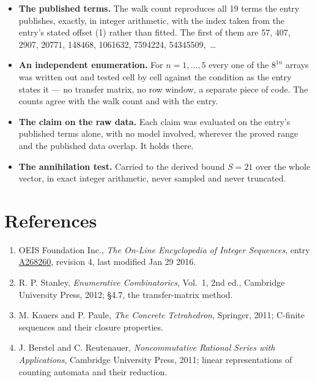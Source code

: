 \documentclass[11pt]{article}
\theoremstyle{definition}
\begin{document}
\begin{itemize}

\item {\bfseries The published terms.} The walk count reproduces all 19 terms the entry publishes, exactly, in integer arithmetic, with the index taken from the entry's stated offset (1) rather than fitted. The first of them are 57, 407, 2907, 20771, 148468, 1061632, 7594224, 54345509,~\dots

\item {\bfseries An independent enumeration.} For $n = 1,\dots,5$ every one of the $8^{1n}$ arrays was written out and tested cell by cell against the condition as the entry states it --- no transfer matrix, no row window, a separate piece of code. The counts agree with the walk count and with the entry.

\item {\bfseries The claim on the raw data.} Each claim was evaluated on the entry's published terms alone, with no model involved, wherever the proved range and the published data overlap. It holds there.

\item {\bfseries The annihilation test.} Carried to the derived bound $S = 21$ over the whole vector, in exact integer arithmetic, never sampled and never truncated.

\end{itemize}

\section{References}

\begin{enumerate}

\item OEIS Foundation Inc., \emph{The On-Line Encyclopedia of Integer Sequences}, entry \href{https://oeis.org/A268260}{A268260}, revision 4, last modified Jan 29 2016.

\item R. P. Stanley, \emph{Enumerative Combinatorics}, Vol.~1, 2nd ed., Cambridge University Press, 2012; \S4.7, the transfer-matrix method.

\item M. Kauers and P. Paule, \emph{The Concrete Tetrahedron}, Springer, 2011; C-finite sequences and their closure properties.

\item J. Berstel and C. Reutenauer, \emph{Noncommutative Rational Series with Applications}, Cambridge University Press, 2011; linear representations of counting automata and their reduction.

\end{enumerate}
\end{document}
